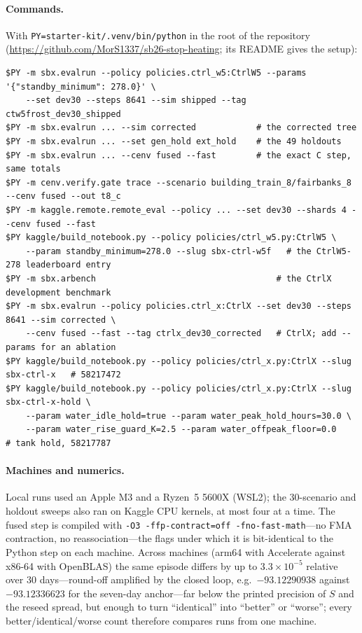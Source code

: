 \documentclass{article}
\newcommand{\e}[1]{\times10^{-#1}}
\begin{document}
\paragraph{Commands.} With \texttt{PY=starter-kit/.venv/bin/python} in the root of the repository
(\url{https://github.com/MorS1337/sb26-stop-heating}; its README gives the setup):
{\footnotesize
\begin{verbatim}
$PY -m sbx.evalrun --policy policies.ctrl_w5:CtrlW5 --params '{"standby_minimum": 278.0}' \
    --set dev30 --steps 8641 --sim shipped --tag ctw5frost_dev30_shipped
$PY -m sbx.evalrun ... --sim corrected            # the corrected tree
$PY -m sbx.evalrun ... --set gen_hold ext_hold    # the 49 holdouts
$PY -m sbx.evalrun ... --cenv fused --fast        # the exact C step, same totals
$PY -m cenv.verify.gate trace --scenario building_train_8/fairbanks_8 --cenv fused --out t8_c
$PY -m kaggle.remote.remote_eval --policy ... --set dev30 --shards 4 --cenv fused --fast
$PY kaggle/build_notebook.py --policy policies/ctrl_w5.py:CtrlW5 \
    --param standby_minimum=278.0 --slug sbx-ctrl-w5f   # the CtrlW5-278 leaderboard entry
$PY -m sbx.arbench                                    # the CtrlX development benchmark
$PY -m sbx.evalrun --policy policies.ctrl_x:CtrlX --set dev30 --steps 8641 --sim corrected \
    --cenv fused --fast --tag ctrlx_dev30_corrected   # CtrlX; add --params for an ablation
$PY kaggle/build_notebook.py --policy policies/ctrl_x.py:CtrlX --slug sbx-ctrl-x   # 58217472
$PY kaggle/build_notebook.py --policy policies/ctrl_x.py:CtrlX --slug sbx-ctrl-x-hold \
    --param water_idle_hold=true --param water_peak_hold_hours=30.0 \
    --param water_rise_guard_K=2.5 --param water_offpeak_floor=0.0      # tank hold, 58217787
\end{verbatim}}

\paragraph{Machines and numerics.} Local runs used an Apple M3 and a Ryzen~5 5600X (WSL2); the
30-scenario and holdout sweeps also ran on Kaggle CPU kernels, at most four at a time. The fused
step is compiled with \texttt{-O3 -ffp-contract=off -fno-fast-math}---no FMA contraction, no
reassociation---the flags under which it is bit-identical to the Python step on each machine.
Across machines (arm64 with Accelerate against x86-64 with OpenBLAS) the same episode differs by
up to $3.3\e{5}$ relative over 30 days---round-off amplified by the closed loop, e.g.\
$-93.12290938$ against $-93.12336623$ for the seven-day anchor---far below the printed precision
of $S$ and the reseed spread, but enough to turn ``identical'' into ``better'' or ``worse''; every
better/identical/worse count therefore compares runs from one machine.
\end{document}
